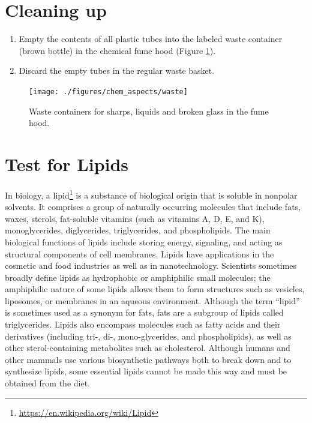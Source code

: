 \documentclass[]{book}
\providecommand{\tightlist}{%
  \setlength{\itemsep}{0pt}\setlength{\parskip}{0pt}}
\let\rmarkdownfootnote\footnote%
\def\footnote{\protect\rmarkdownfootnote}
\renewcommand{\href}[2]{#2\footnote{\url{#1}}}
\begin{document}
\hypertarget{cleaning-up}{%
\section{Cleaning up}\label{cleaning-up}}

\begin{enumerate}
\def\labelenumi{\arabic{enumi}.}
\tightlist
\item
  Empty the contents of all plastic tubes into the labeled waste container (brown bottle) in the chemical fume hood (Figure \ref{fig:waste}).
\item
  Discard the empty tubes in the regular waste basket.
\end{enumerate}

\begin{figure}

{\centering \texttt{[image: ./figures/chem\_aspects/waste]} 

}

\caption{Waste containers for sharps, liquids and broken glass in the fume hood.}\label{fig:waste}
\end{figure}

\hypertarget{test-for-lipids}{%
\section{Test for Lipids}\label{test-for-lipids}}

In biology, a \href{https://en.wikipedia.org/wiki/Lipid}{lipid} is a substance of biological origin that is soluble in nonpolar solvents. It comprises a group of naturally occurring molecules that include fats, waxes, sterols, fat-soluble vitamins (such as vitamins A, D, E, and K), monoglycerides, diglycerides, triglycerides, and phospholipids. The main biological functions of lipids include storing energy, signaling, and acting as structural components of cell membranes. Lipids have applications in the cosmetic and food industries as well as in nanotechnology.
Scientists sometimes broadly define lipids as hydrophobic or amphiphilic small molecules; the amphiphilic nature of some lipids allows them to form structures such as vesicles, liposomes, or membranes in an aqueous environment.
Although the term ``lipid'' is sometimes used as a synonym for fats, fats are a subgroup of lipids called triglycerides. Lipids also encompass molecules such as fatty acids and their derivatives (including tri-, di-, mono-glycerides, and phospholipids), as well as other sterol-containing metabolites such as cholesterol. Although humans and other mammals use various biosynthetic pathways both to break down and to synthesize lipids, some essential lipids cannot be made this way and must be obtained from the diet.
\end{document}

